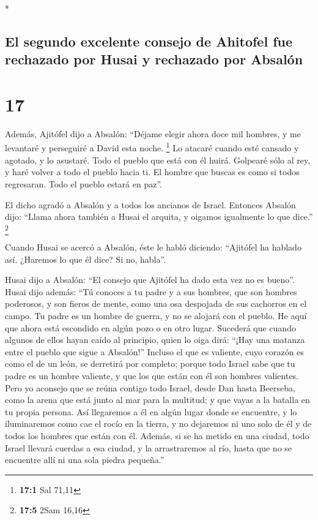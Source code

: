 \begin{paracol}{2}
\begin{otherlanguage}{english}
\end{otherlanguage}

\switchcolumn[0]*

\hypertarget{el-segundo-excelente-consejo-de-ahitofel-fue-rechazado-por-husai-y-rechazado-por-absaluxf3n}{%
\subsection{El segundo excelente consejo de Ahitofel fue rechazado por
Husai y rechazado por
Absalón}\label{el-segundo-excelente-consejo-de-ahitofel-fue-rechazado-por-husai-y-rechazado-por-absaluxf3n}}

\hypertarget{section-32}{%
\section{17}\label{section-32}}

 Además, Ajitófel dijo a Absalón: ``Déjame elegir ahora
doce mil hombres, y me levantaré y perseguiré a David esta noche.
\footnote{\textbf{17:1} Sal 71,11}  Lo atacaré cuando esté
cansado y agotado, y lo asustaré. Todo el pueblo que está con él huirá.
Golpearé sólo al rey,  y haré volver a todo el pueblo
hacia ti. El hombre que buscas es como si todos regresaran. Todo el
pueblo estará en paz''.

 El dicho agradó a Absalón y a todos los ancianos de
Israel.  Entonces Absalón dijo: ``Llama ahora también a
Husai el arquita, y oigamos igualmente lo que dice.'' \footnote{\textbf{17:5}
  2Sam 16,16}

 Cuando Husai se acercó a Absalón, éste le habló diciendo:
``Ajitófel ha hablado así. ¿Haremos lo que él dice? Si no, habla''.

 Husai dijo a Absalón: ``El consejo que Ajitófel ha dado
esta vez no es bueno''.  Husai dijo además: ``Tú conoces a
tu padre y a sus hombres, que son hombres poderosos, y son fieros de
mente, como una osa despojada de sus cachorros en el campo. Tu padre es
un hombre de guerra, y no se alojará con el pueblo.  He
aquí que ahora está escondido en algún pozo o en otro lugar. Sucederá
que cuando algunos de ellos hayan caído al principio, quien lo oiga
dirá: ``¡Hay una matanza entre el pueblo que sigue a Absalón!''
 Incluso el que es valiente, cuyo corazón es como el de
un león, se derretirá por completo; porque todo Israel sabe que tu padre
es un hombre valiente, y que los que están con él son hombres valientes.
 Pero yo aconsejo que se reúna contigo todo Israel, desde
Dan hasta Beerseba, como la arena que está junto al mar para la
multitud; y que vayas a la batalla en tu propia persona. 
Así llegaremos a él en algún lugar donde se encuentre, y lo iluminaremos
como cae el rocío en la tierra, y no dejaremos ni uno solo de él y de
todos los hombres que están con él.  Además, si se ha
metido en una ciudad, todo Israel llevará cuerdas a esa ciudad, y la
arrastraremos al río, hasta que no se encuentre allí ni una sola piedra
pequeña.''


\end{paracol}
